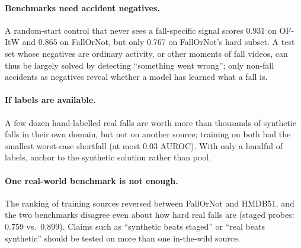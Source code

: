 \documentclass[10pt,twocolumn,letterpaper]{article}
\begin{document}
\paragraph{Benchmarks need accident negatives.} A random-start control that never sees a fall-specific signal scores 0.931 on OF-ItW and $0.865$ on FallOrNot, but only 0.767 on FallOrNot's hard subset. A test set whose negatives are ordinary activity, or other moments of fall videos, can thus be largely solved by detecting ``something went wrong''; only non-fall accidents as negatives reveal whether a model has learned what a fall is.

\paragraph{If labels are available.} A few dozen hand-labelled real falls are worth more than thousands of synthetic falls in their own domain, but not on another source; training on both had the smallest worst-case shortfall (at most 0.03 AUROC). With only a handful of labels, anchor to the synthetic solution rather than pool.

\paragraph{One real-world benchmark is not enough.} The ranking of training sources reversed between FallOrNot and HMDB51, and the two benchmarks disagree even about how hard real falls are (staged probes: 0.759 vs.\ 0.899). Claims such as ``synthetic beats staged'' or ``real beats synthetic'' should be tested on more than one in-the-wild source.

\end{document}
